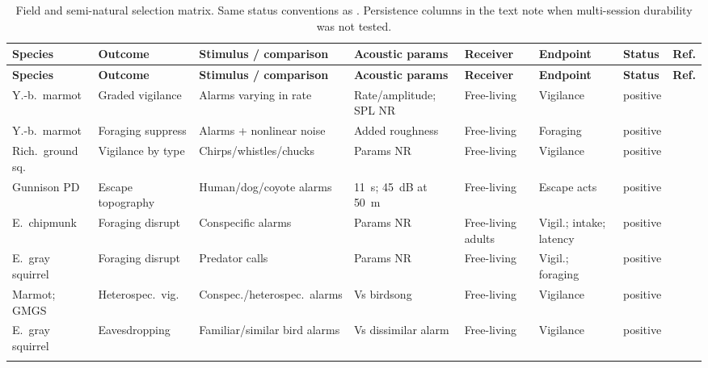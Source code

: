 \begin{landscape}
\begingroup
\footnotesize
\singlespacing
\setlength{\tabcolsep}{3pt}
\begin{longtable}{@{}p{0.95in}p{0.8in}p{1.25in}p{1.15in}p{0.85in}p{0.85in}p{0.55in}p{0.7in}@{}}
\caption{Field and semi-natural selection matrix. Same status conventions as . Persistence columns in the text note when multi-session durability was not tested.}\label{tab:practical-field}\\
\toprule
\textbf{Species} & \textbf{Outcome} & \textbf{Stimulus / comparison} & \textbf{Acoustic params} & \textbf{Receiver} & \textbf{Endpoint} & \textbf{Status} & \textbf{Ref.} \\
\midrule
\endfirsthead
\toprule
\textbf{Species} & \textbf{Outcome} & \textbf{Stimulus / comparison} & \textbf{Acoustic params} & \textbf{Receiver} & \textbf{Endpoint} & \textbf{Status} & \textbf{Ref.} \\
\midrule
\endhead
\bottomrule
\endlastfoot
Y.-b.\ marmot & Graded vigilance & Alarms varying in rate & Rate/amplitude; SPL NR & Free-living & Vigilance & positive & \citet{BlumsteinArmitage1997} \\ \addlinespace[2pt]
Y.-b.\ marmot & Foraging suppress & Alarms + nonlinear noise & Added roughness & Free-living & Foraging & positive & \citet{BlumsteinRecapet2009} \\ \addlinespace[2pt]
Rich.\ ground sq.\ & Vigilance by type & Chirps/whistles/chucks & Params NR & Free-living & Vigilance & positive & \citet{SloanEtAl2005} \\ \addlinespace[2pt]
Gunnison PD & Escape topography & Human/dog/coyote alarms & 11~s; 45~dB at 50~m & Free-living & Escape acts & positive & \citet{KiriazisSlobodchikoff2006} \\ \addlinespace[2pt]
E.\ chipmunk & Foraging disrupt & Conspecific alarms & Params NR & Free-living adults & Vigil.; intake; latency & positive & \citet{BaackSwitzer2000} \\ \addlinespace[2pt]
E.\ gray squirrel & Foraging disrupt & Predator calls & Params NR & Free-living & Vigil.; foraging & positive & \citet{JayneEtAl2015} \\ \addlinespace[2pt]
Marmot; GMGS & Heterospec.\ vig.\ & Conspec./heterospec.\ alarms & Vs birdsong & Free-living & Vigilance & positive & \citet{Shriner1998} \\ \addlinespace[2pt]
E.\ gray squirrel & Eavesdropping & Familiar/similar bird alarms & Vs dissimilar alarm & Free-living & Vigilance & positive & \citet{GetschowEtAl2013} \\ \addlinespace[2pt]

\end{longtable}
\end{landscape}
